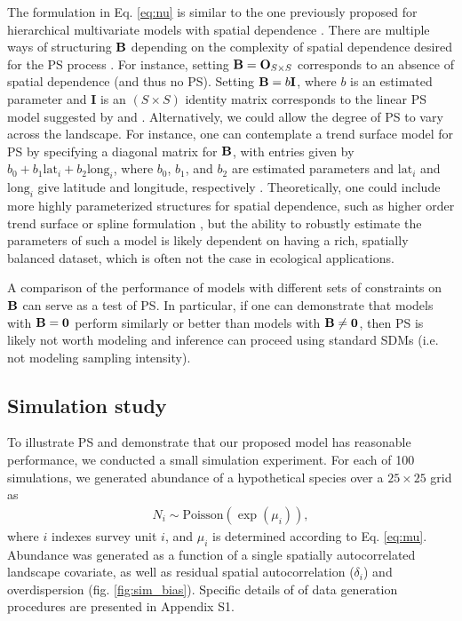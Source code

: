\documentclass[times,mee,doublespace,]{besauth2}
\begin{document}
 The formulation in Eq. \ref{eq:nu} is similar to the one previously proposed for hierarchical multivariate models with spatial dependence \citep[cf.][]{RoyleBerliner1999}.  There are multiple ways of structuring ${\bf B}$ depending on the complexity of spatial dependence desired for the PS process \citep{RoyleBerliner1999}.  For instance, setting ${\bf B} = {\bf O}_{S \times S}$ corresponds to an absence of spatial dependence (and thus no PS).  Setting ${\bf B} = b {\bf I}$, where $b$ is an estimated parameter and {\bf I} is an $(S \times S)$ identity matrix corresponds to the linear PS model suggested by \citet{DiggleEtAl2010} and \citet{PatiEtAl2011}.  Alternatively, we could allow the degree of PS to vary across the landscape.  For instance, one can contemplate a trend surface model for PS by specifying a diagonal matrix for ${\bf B}$, with entries given by $b_0 + b_1 \textrm{lat}_i + b_2 \textrm{long}_i$, where $b_0$, $b_1$, and $b_2$ are estimated parameters and $\textrm{lat}_i$ and $\textrm{long}_i$ give latitude and longitude, respectively \citep{RoyleBerliner1999}.  Theoretically, one could include more highly parameterized structures for spatial dependence, such as higher order trend surface or spline formulation \citep{RoyleBerliner1999}, but the ability to robustly estimate the parameters of such a model is likely dependent on having a rich, spatially balanced dataset, which is often not the case in ecological applications.

A comparison of the performance of models with different sets of constraints on ${\bf B}$ can serve as a test of PS.  In particular, if one can demonstrate that models with ${\bf B}={\bf 0}$ perform similarly or better than models with ${\bf B} \ne {\bf 0}$, then PS is likely not worth modeling and inference can proceed using standard SDMs (i.e. not modeling sampling intensity).


\subsection{Simulation study}

To illustrate PS and demonstrate that our proposed model has reasonable performance, we conducted a small simulation experiment.  For each of 100 simulations, we generated abundance of a hypothetical species over a $25 \times 25$ grid as
\begin{eqnarray*}
  N_i \sim \textrm{Poisson}(\exp(\mu_i)),
\end{eqnarray*}
where $i$ indexes survey unit $i$, and $\mu_i$ is determined according to Eq. \ref{eq:mu}. Abundance was generated as a function of a single spatially autocorrelated landscape covariate, as well as residual spatial autocorrelation ($\delta_i$) and overdispersion (fig. \ref{fig:sim_bias}). Specific details of of data generation procedures are presented in Appendix S1.
\end{document}
